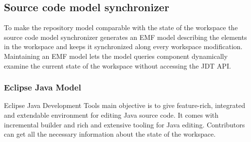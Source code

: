 \subsection{Source code model synchronizer}
To make the repository model comparable with the state of the workspace the
source code model synchronizer generates an EMF model describing the elements
in the workspace and keeps it synchronized along every workspace modification.
Maintaining an EMF model lets the model queries component dynamically examine
the current state of the workspace without accessing the JDT API.

\subsubsection{Eclipse Java Model}
Eclipse Java Development Tools main objective is to give feature-rich,
integrated and extendable environment for editing Java source code. It comes
with incremental builder and rich and extensive tooling for Java editing.
Contributors can get all the necessary information about the state of the
workspace.


